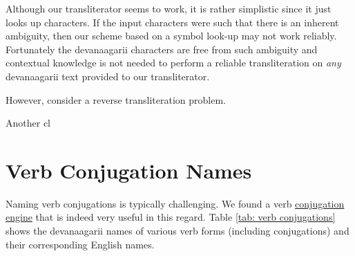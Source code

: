 \documentclass[a4paper, 12pt]{article}
\newcommand \sans[1]{
    \textsanskrit{#1}
}
\begin{document}
Although our transliterator seems to work, it is rather simplistic since it just looks up characters. If the input characters were such that there is an inherent ambiguity, then our scheme based on a symbol look-up may not work reliably. Fortunately the \sans{devanaagarii} characters are free from such ambiguity and contextual knowledge is not needed to perform a reliable transliteration on \emph{any} \sans{devanaagarii} text provided to our transliterator.

However, consider a reverse transliteration problem.

Another cl
\newpage
\appendix
\section {Verb Conjugation Names}
Naming verb conjugations is typically challenging. We found a verb \href{https://sanskrit.inria.fr/cgi-bin/SKT/sktconjug.cgi?q=bhuu;c=1;font=deva}{conjugation engine} that is indeed very useful in this regard. Table \ref{tab: verb conjugations} shows the \sans{devanaagarii} names of various verb forms (including conjugations) and their corresponding English names.
\end{document}
